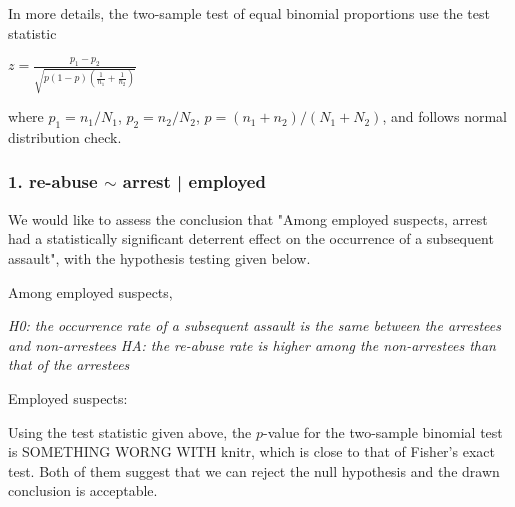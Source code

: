 \documentclass{article}
\newcommand{\rinline}[1]{SOMETHING WORNG WITH knitr}
\begin{document}
In more details, the two-sample test of equal binomial proportions use
the test statistic
\begin{center}
$\displaystyle z=\frac{p_1 - p_2}{\sqrt{p(1-p)(\frac{1}{n_1}+\frac{1}{n_2})}}$
\end{center}
where $p_1=n_1/N_1$, $p_2=n_2/N_2$, $p=(n_1+n_2)/(N_1+N_2)$, and
follows normal distribution check.\newline


\subsubsection*{1. re-abuse $\sim$ arrest | employed}
\hspace{12 pt} We would like to assess the conclusion that "Among
employed suspects, arrest had a statistically significant deterrent
effect on the occurrence of a subsequent assault", with the hypothesis
testing given below.


Among employed suspects,


\hspace{12 pt} \textit{H0: the occurrence rate of a subsequent assault
  is the same between the arrestees and non-arrestees} \newline
\vspace{2 pt}
\hspace{24 pt} \textit{HA: the re-abuse rate is higher among the
  non-arrestees than that of the arrestees} \newline


Employed suspects:


Using the test statistic given above, the $p$-value for the two-sample
binomial test is \rinline{1 - pnorm(two.binom.test(cl1))}, which is
close to that of Fisher's exact test. Both of them suggest that we can
reject the null hypothesis and the drawn conclusion is acceptable.
\end{document}
